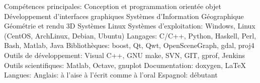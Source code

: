 \begin{cvskills}
  \cvskill
    {Compétences principales:}
 	{
		Conception et programmation orientée objet \newline
 	 	Développement d'interfaces graphiques \newline
 	 	Systèmes d'Information Géographique \newline
	 	Géométrie et rendu 3D \newline
	 	Systèmes Linux
	}
  \cvskill
    {Systèmes d'exploitation:}
 	{Windows, Linux (CentOS, ArchLinux, Debian, Ubuntu)}
  \cvskill
    {Langages:}
 	{C/C++, Python, Haskell, Perl, Bash, Matlab, Java}
  \cvskill
    {Bibliothèques:}
 	{boost, Qt, Qwt, OpenSceneGraph, gdal, proj4}
  \cvskill
	{Outils de développement:}
	{Visual C++, GNU make, SVN, GIT, gprof, Jenkins}
  \cvskill
	{Outils scientifiques:}
	{Matlab, Octave, gnuplot}
  \cvskill
	{Documentation:}
	{doxygen, \LaTeX}
  \cvskill
    {Langues:}
 	{
		Anglais: à l'aise à l'écrit comme à l'oral \newline
		Espagnol: débutant
	}
\end{cvskills}


